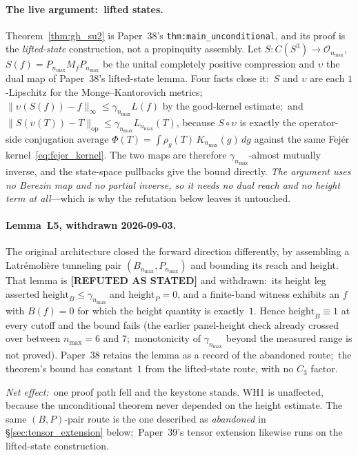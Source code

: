 \documentclass[11pt,a4paper]{article}
\theoremstyle{plain}
\theoremstyle{definition}
\newcommand{\nmax}{n_{\max}}
\newcommand{\sthree}{S^{3}}
\newcommand{\Op}{\mathcal{O}}
\newcommand{\opnorm}[1]{\lVert #1 \rVert_{\mathrm{op}}}
\newcommand{\norm}[1]{\lVert #1 \rVert}
\begin{document}
\paragraph{The live argument:\ lifted states.}
Theorem~\ref{thm:gh_su2} is Paper~38's
\texttt{thm:main\_unconditional}, and its proof is the
\emph{lifted-state} construction, not a propinquity assembly.  Let
$S : C(\sthree) \to \Op_{\nmax}$, $S(f) = P_{\nmax} M_f P_{\nmax}$ be
the unital completely positive compression and $\upsilon$ the dual map
of Paper~38's lifted-state lemma.  Four facts close it:\ $S$ and
$\upsilon$ are each $1$-Lipschitz for the Monge--Kantorovich metrics;\
$\norm{\upsilon(S(f)) - f}_\infty \le \gamma_{\nmax} L(f)$ by the
good-kernel estimate;\ and
$\opnorm{S(\upsilon(T)) - T} \le \gamma_{\nmax} L_{\nmax}(T)$, because
$S \circ \upsilon$ is exactly the operator-side conjugation average
$\Phi(T) = \int \rho_g(T)\,K_{\nmax}(g)\,dg$ against the same Fej\'er
kernel~\eqref{eq:fejer_kernel}.  The two maps are therefore $\gamma_{\nmax}$-almost mutually
inverse, and the state-space pullbacks give the bound directly.
\emph{The argument uses no Berezin map and no partial inverse, so it
needs no dual reach and no height term at all}---which is why the
refutation below leaves it untouched.

\paragraph{Lemma~L5, withdrawn 2026-09-03.}
The original architecture closed the forward direction differently, by
assembling a Latr\'emoli\`ere tunneling pair $(B_{\nmax}, P_{\nmax})$
\cite{latremoliere_metric_st_2017} and bounding its reach and height.
That lemma is \textbf{[REFUTED AS STATED]} and withdrawn:\ its height
leg asserted $\mathrm{height}_{B} \le \gamma_{\nmax}$ and
$\mathrm{height}_{P} = 0$, and a finite-band witness exhibits an
$f$ with $B(f) = 0$ for which the height quantity is exactly~$1$.  Hence
$\mathrm{height}_{B} \equiv 1$ at every cutoff and the bound fails (the
earlier panel-height check already crossed over between $\nmax = 6$ and
$7$;\ monotonicity of $\gamma_{\nmax}$ beyond the measured range is not
proved).  Paper~38 retains the lemma as a record of the
abandoned route;\ the theorem's bound has constant~$1$ from the
lifted-state route, with no $C_3$ factor.

\emph{Net effect:}\ one proof path fell and the keystone stands.  WH1 is
unaffected, because the unconditional theorem never depended on the
height estimate.  The same $(B, P)$-pair route is the one described as
\emph{abandoned} in \S\ref{sec:tensor_extension} below;\ Paper~39's
tensor extension likewise runs on the lifted-state construction.
\end{document}
